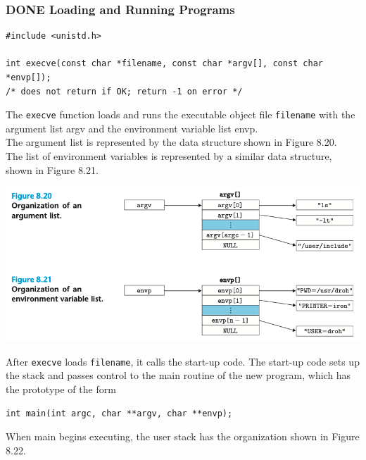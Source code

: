\documentclass[11pt]{article}
\begin{document}
\subsubsection{{\bfseries\sffamily DONE} Loading and Running Programs}
\label{sec:orga765c2f}
\begin{verbatim}
#include <unistd.h>

int execve(const char *filename, const char *argv[], const char *envp[]);
/* does not return if OK; return -1 on error */
\end{verbatim}

The \texttt{execve} function loads and runs the executable object file \texttt{filename} with the argument list argv and the environment variable list envp.\\

The argument list is represented by the data structure shown in Figure 8.20.\\
The list of environment variables is represented by a similar data structure, shown in Figure 8.21.\\

\begin{center}
\includegraphics[width=.9\linewidth]{pics/figure8.20-8.21-execve.png}
\end{center}


After \texttt{execve} loads \texttt{filename}, it calls the start-up code. The start-up code sets up the stack and passes control to the main routine of the new program, which has the prototype of the form\\
\begin{verbatim}
int main(int argc, char **argv, char **envp);
\end{verbatim}
When main begins executing, the user stack has the organization shown in Figure 8.22.\\
\end{document}
